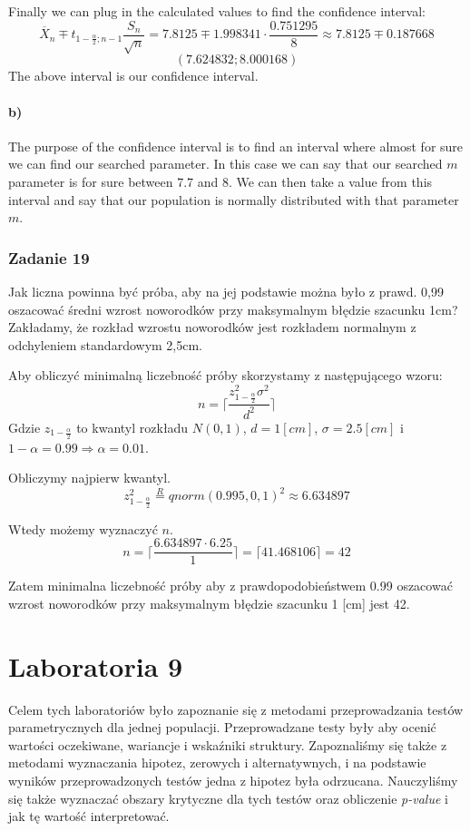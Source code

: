 \documentclass{article}
\begin{document}
Finally we can plug in the calculated values to find the confidence interval:
\[ \overline{X}_n \mp t_{1-\frac{\alpha}{2};n-1} \frac{S_n}{\sqrt{n}} = 7.8125 \mp 1.998341\cdot \frac{0.751295}{8} \approx 7.8125 \mp 0.187668\]
\[ (7.624832 ; 8.000168) \]
The above interval is our confidence interval.

\subsection{b)}
The purpose of the confidence interval is to find an interval where almost for sure we can find our searched parameter. In this case we can say that our searched $m$ parameter is for sure between 7.7 and 8. We can then take a value from this interval and say that our population is normally distributed with that parameter $m$.

\newpage
\section{Zadanie 19}
Jak liczna powinna być próba, aby na jej podstawie można było z prawd. 0,99 oszacować średni wzrost noworodków przy maksymalnym błędzie szacunku 1cm? Zakładamy, że rozkład wzrostu noworodków jest rozkładem normalnym z odchyleniem standardowym 2,5cm. \\ \par

Aby obliczyć minimalną liczebność próby skorzystamy z następującego wzoru:
\[ n = \Big\lceil \frac{z^2_{1-\frac{\alpha}{2}} \sigma^2}{d^2} \Big\rceil \]
Gdzie $z_{1-\frac{\alpha}{2}}$ to kwantyl rozkładu $N(0,1)$, $d = 1 [cm]$, $\sigma = 2.5 [cm]$ i $1 - \alpha = 0.99 \Rightarrow \alpha = 0.01$.

Obliczymy najpierw kwantyl.
\[ z^2_{1-\frac{\alpha}{2}} \overset{R}{=} qnorm(0.995, 0, 1)^2 \approx 6.634897 \]

Wtedy możemy wyznaczyć $n$.
\[ n = \Big\lceil \frac{6.634897 \cdot 6.25 }{1} \Big\rceil = \lceil 41.468106 \rceil = 42 \]

Zatem minimalna liczebność próby aby z prawdopodobieństwem 0.99 oszacować wzrost noworodków przy maksymalnym błędzie szacunku 1 [cm] jest 42.

\newpage
\part{Laboratoria 9}
Celem tych laboratoriów było zapoznanie się z metodami przeprowadzania testów parametrycznych dla jednej populacji. Przeprowadzane testy były aby ocenić wartości oczekiwane, wariancje i wskaźniki struktury. Zapoznaliśmy się także z metodami wyznaczania hipotez, zerowych i alternatywnych, i na podstawie wyników przeprowadzonych testów jedna z hipotez była odrzucana. Nauczyliśmy się także wyznaczać obszary krytyczne dla tych testów oraz obliczenie \textit{p-value} i jak tę wartość interpretować.
\end{document}
